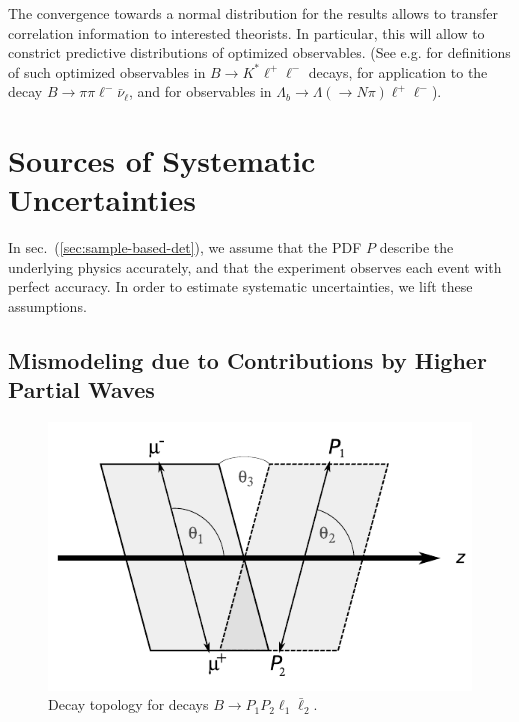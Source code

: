 \documentclass[aps,prd,reprint,nofootinbib,preprintnumbers]{revtex4}
\newcommand{\refsec}[1]{sec.~(\ref{sec:#1})}
\begin{document}
The convergence towards a normal distribution for the results allows to transfer correlation information to interested
theorists. In particular, this will allow to constrict predictive distributions of optimized observables.
(See e.g. \cite{Egede:2008uy,Egede:2010zc,Bobeth:2010wg,Becirevic:2011bp,Bobeth:2012vn,Matias:2012xw,DescotesGenon:2012zf}
for definitions of such optimized observables in $B\to K^*\ell^+\ell^-$ decays, \cite{Faller:2013dwa} for application to
the decay $B\to \pi\pi\ell^-\bar\nu_\ell$, and \cite{Boeer:2014xx} for observables in $\Lambda_b\to\Lambda(\to N\pi)\ell^+\ell^-$).



\section{Sources of Systematic Uncertainties}
\label{sec:systematics}

In \refsec{sample-based-det}, we assume that the PDF $P$ describe the underlying physics accurately,
and that the experiment observes each event with perfect accuracy. In order to estimate systematic
uncertainties, we lift these assumptions.

\subsection{Mismodeling due to Contributions by Higher Partial Waves}
\label{sec:systematics:partial-waves}

\begin{figure}
    \includegraphics[width=.6\textwidth]{fig-topology.pdf}
    \caption{Decay topology for decays $B\to P_1 P_2 \ell_1 \bar\ell_2$. \label{fig:topology}}
\end{figure}
\end{document}
